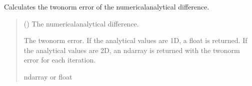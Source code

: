 \documentclass[a4paper,11pt,english,openany]{sphinxmanual}
\begin{document}
\begin{fulllineitems}
\begin{fulllineitems}
\label{\detokenize{api/spyice.utils.error_norms:spyice.utils.error_norms.ErrorNorms.two_norm}}
\pysigstartsignatures
{}
\pysigstopsignatures
\sphinxAtStartPar
Calculates the two\sphinxhyphen{}norm error of the numerical\sphinxhyphen{}analytical difference.
\begin{quote}\begin{description}
\sphinxAtStartPar
{} () \textendash{} The numerical\sphinxhyphen{}analytical difference.

\sphinxAtStartPar
The two\sphinxhyphen{}norm error. If the analytical values are 1D, a float is returned.
If the analytical values are 2D, an ndarray is returned with the two\sphinxhyphen{}norm error for each iteration.

\sphinxAtStartPar
ndarray or float

\end{description}\end{quote}

\end{fulllineitems}


\end{fulllineitems}


\sphinxstepscope
{}\label{\detokenize{api/spyice.utils.helpers:module-spyice.utils.helpers}}
\end{document}
